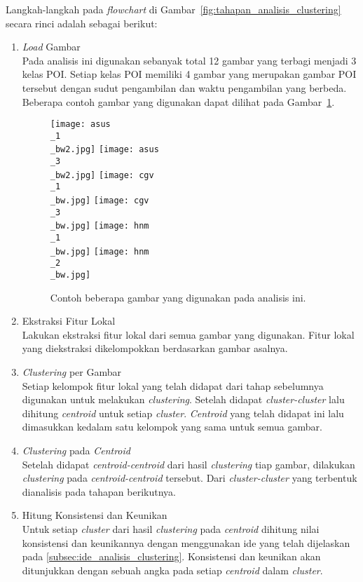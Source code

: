 Langkah-langkah pada \textit{flowchart} di Gambar~\ref{fig:tahapan_analisis_clustering} secara rinci adalah sebagai berikut:
\begin{enumerate}
	\item \textit{Load} Gambar \\
	Pada analisis ini digunakan sebanyak total 12 gambar yang terbagi menjadi 3 kelas POI. Setiap kelas POI memiliki 4 gambar yang merupakan gambar POI tersebut dengan sudut pengambilan dan waktu pengambilan yang berbeda. Beberapa contoh gambar yang digunakan dapat dilihat pada Gambar~\ref{fig:gambar_analisis_clustering}.
	\begin{figure}[H]
		\centering
		\texttt{[image: asus\\\_1\\\_bw2.jpg]}
		\texttt{[image: asus\\\_3\\\_bw2.jpg]}
		\texttt{[image: cgv\\\_1\\\_bw.jpg]}
		\texttt{[image: cgv\\\_3\\\_bw.jpg]}
		\texttt{[image: hnm\\\_1\\\_bw.jpg]}
		\texttt{[image: hnm\\\_2\\\_bw.jpg]}
		\caption{Contoh beberapa gambar yang digunakan pada analisis ini.}
		\label{fig:gambar_analisis_clustering}
	\end{figure}
	\item Ekstraksi Fitur Lokal \\
	Lakukan ekstraksi fitur lokal dari semua gambar yang digunakan. Fitur lokal yang diekstraksi dikelompokkan berdasarkan gambar asalnya.
	\item \textit{Clustering} per Gambar \\
	Setiap kelompok fitur lokal yang telah didapat dari tahap sebelumnya digunakan untuk melakukan \textit{clustering}. Setelah didapat \textit{cluster-cluster} lalu dihitung \textit{centroid} untuk setiap \textit{cluster}. \textit{Centroid} yang telah didapat ini lalu dimasukkan kedalam satu kelompok yang sama untuk semua gambar.
	\item \textit{Clustering} pada \textit{Centroid} \\
	Setelah didapat \textit{centroid-centroid} dari hasil \textit{clustering} tiap gambar, dilakukan \textit{clustering} pada \textit{centroid-centroid} tersebut. Dari \textit{cluster-cluster} yang terbentuk dianalisis pada tahapan berikutnya.
	\item Hitung Konsistensi dan Keunikan \\
	Untuk setiap \textit{cluster} dari hasil \textit{clustering} pada \textit{centroid} dihitung nilai konsistensi dan keunikannya dengan menggunakan ide yang telah dijelaskan pada \ref{subsec:ide_analisis_clustering}. Konsistensi dan keunikan akan ditunjukkan dengan sebuah angka pada setiap \textit{centroid} dalam \textit{cluster}.

\end{enumerate}
